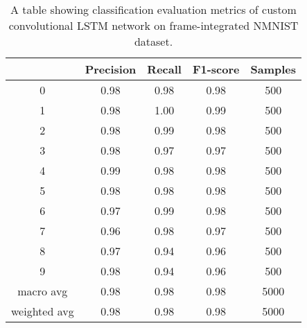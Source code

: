 \begin{table}[htb]
    \centering
    \begin{tabular}{|| c | c | c | c | c ||}
        \hline
             & Precision & Recall & F1-score & Samples \\
        \hline \hline
        0            & 0.98 & 0.98 & 0.98 & 500  \\
        \hline
        1            & 0.98 & 1.00 & 0.99 & 500  \\
        \hline
        2            & 0.98 & 0.99 & 0.98 & 500  \\
        \hline
        3            & 0.98 & 0.97 & 0.97 & 500  \\
        \hline
        4            & 0.99 & 0.98 & 0.98 & 500  \\
        \hline
        5            & 0.98 & 0.98 & 0.98 & 500  \\
        \hline
        6            & 0.97 & 0.99 & 0.98 & 500  \\
        \hline
        7            & 0.96 & 0.98 & 0.97 & 500  \\
        \hline
        8            & 0.97 & 0.94 & 0.96 & 500  \\
        \hline
        9            & 0.98 & 0.94 & 0.96 & 500  \\
        \hline
        macro avg    & 0.98 & 0.98 & 0.98 & 5000 \\
        \hline
        weighted avg & 0.98 & 0.98 & 0.98 & 5000 \\
        \hline
    \end{tabular}
    \caption{A table showing classification evaluation metrics of custom convolutional LSTM network on frame-integrated NMNIST dataset.}
    \label{tab:custom_conv_lstm_nmnist_evaluation_metrics}
\end{table}

